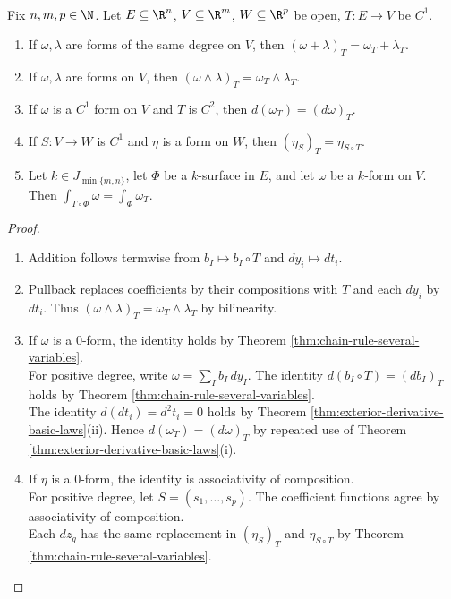 \begin{theorem} \label{thm:pullback-basic-laws} \\
Fix $n,m,p\in\N$. Let $E\subseteq\R^n$, $V\subseteq\R^m$, $W\subseteq\R^p$ be open, $T:E\to V$ be $C^1$.
\begin{enumerate}[label=(\roman*)]
\setlength{\itemsep}{0pt}
\item If $\omega,\lambda$ are forms of the same degree on $V$, then $(\omega+\lambda)_T=\omega_T+\lambda_T$.
\item If $\omega,\lambda$ are forms on $V$, then $(\omega\wedge\lambda)_T=\omega_T\wedge\lambda_T$.
\item If $\omega$ is a $C^1$ form on $V$ and $T$ is $C^2$, then $d(\omega_T)=(d\omega)_T$.
\item If $S:V\to W$ is $C^1$ and $\eta$ is a form on $W$, then $(\eta_S)_T=\eta_{S\circ T}$.
\item Let $k\in J_{\min\{m,n\}}$, let $\Phi$ be a $k$-surface in $E$, and let $\omega$ be a $k$-form on $V$. Then $\int_{T\circ\Phi}\omega=\int_{\Phi}\omega_T$.
\end{enumerate}
\begin{proof}
\begin{enumerate}[label=(\roman*)]
\setlength{\itemsep}{0pt}
\item Addition follows termwise from $b_I\mapsto b_I\circ T$ and $dy_i\mapsto dt_i$.
\item Pullback replaces coefficients by their compositions with $T$ and each $dy_i$ by $dt_i$. Thus $(\omega\wedge\lambda)_T=\omega_T\wedge\lambda_T$ by bilinearity.
\item If $\omega$ is a $0$-form, the identity holds by Theorem \ref{thm:chain-rule-several-variables}.\\
For positive degree, write $\omega=\sum\limits_I b_I\,dy_I$. The identity $d(b_I\circ T)=(db_I)_T$ holds by Theorem \ref{thm:chain-rule-several-variables}.\\
The identity $d(dt_i)=d^2t_i=0$ holds by Theorem \ref{thm:exterior-derivative-basic-laws}(ii). Hence $d(\omega_T)=(d\omega)_T$ by repeated use of Theorem \ref{thm:exterior-derivative-basic-laws}(i).
\item If $\eta$ is a $0$-form, the identity is associativity of composition.\\
For positive degree, let $S=(s_1,\ldots,s_p)$. The coefficient functions agree by associativity of composition.\\
Each $dz_q$ has the same replacement in $(\eta_S)_T$ and $\eta_{S\circ T}$ by Theorem \ref{thm:chain-rule-several-variables}.

\end{enumerate}
\end{proof}
\end{theorem}
